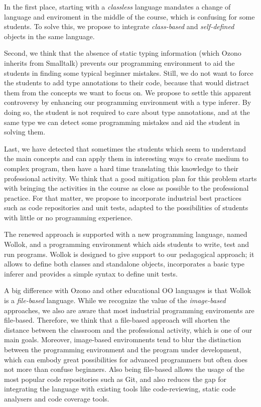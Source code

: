 In the first place, starting with a \emph{classless} language mandates a change of language and enviroment in the middle of the course,
which is confusing for some students. 
To solve this, we propose to integrate \emph{class-based} and \emph{self-defined} objects in the same language.

Second, we think that the absence of static typing information (which Ozono inherits from Smalltalk) prevents our programming environment to aid the students in finding some typical beginner mistakes.
Still, we do not want to force the students to add type annotations to their code, because that would distract them from the concepts we want to focus on.
We propose to settle this apparent controversy by enhancing our programming environment with a type inferer.
By doing so, the student is not required to care about type annotations, and at the same type we can detect some programming mistakes and aid the student in solving them.

Last, we have detected that sometimes the students which seem to understand the main concepts and can apply them in interesting ways to create medium to complex program, 
then have a hard time translating this knowledge to their professional activity.
We think that a good mitigation plan for this problem starts with bringing the activities in the course as close as possible to the professional practice.
For that matter, we propose to incorporate industrial best practices such as code repositories and unit tests, adapted to the possibilities of students with little or no programming experience.

\medskip
The renewed approach is supported with a new programming language, named Wollok, and a programming environment which aids students to write, test and run programs.
Wollok is designed to give support to our pedagogical approach; 
it allows to define both classes and standalone objects,
incorporates a basic type inferer
and provides a simple syntax to define unit tests.

A big difference with Ozono and other educational OO languages is that Wollok is a \emph{file-based} language.
While we recognize the value of the \emph{image-based} approaches, we also are aware that most industrial programming enviroments are file-based.
Therefore, we think that a file-based approach will shorten the distance between the classroom and the professional activity, which is one of our main goals.
Moreover, image-based enviromnents tend to blur the distinction between the programming environment and the program under development,
which can embody great possibilities for advanced programmers but often does not more than confuse beginners.
Also being file-based allows the usage of the most popular code
repositories such as Git, and also reduces the gap for integrating the language with existing tools like code-reviewing, static code analysers and code coverage tools.

